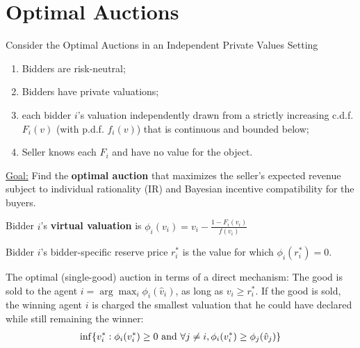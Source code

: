 \documentclass[11pt]{elegantbook}
\begin{document}
\section{Optimal Auctions}
Consider the Optimal Auctions in an Independent Private Values Setting
\begin{enumerate}
    \item Bidders are risk-neutral;
    \item Bidders have private valuations;
    \item each bidder $i$'s valuation independently drawn from a strictly increasing c.d.f. $F_i(v)$ (with p.d.f. $f_i(v)$) that is continuous and bounded below;
    \item Seller knows each $F_i$ and have no value for the object.
\end{enumerate}

\underline{Goal:} Find the \textbf{optimal auction} that maximizes the seller's expected revenue subject to individual rationality (IR) and Bayesian incentive compatibility for the buyers.


\begin{definition}
    \normalfont
    Bidder $i$'s \textbf{virtual valuation} is $\phi_i(v_i)=v_i-\frac{1-F_i(v_i)}{f(v_i)}$
\end{definition}

\begin{definition}
    \normalfont
    Bidder $i$'s bidder-specific reserve price $r_i^*$ is the value for which $\phi_i(r_i^*)=0$.
\end{definition}

\begin{theorem}[Myerson (1981)]
    The optimal (single-good) auction in terms of a direct mechanism: The good is sold to the agent $i=\arg\max_i\phi_i(\hat{v}_i)$, as long as $v_i\geq r_i^*$. If the good is sold, the winning agent $i$ is charged the smallest valuation that he could have declared while still remaining the winner:
    \begin{equation}
        \begin{aligned}
            \inf\{v_i^*:\phi_i(v_i^*)\geq 0 \textnormal{ and }\forall j\neq i, \phi_i(v_i^*)\geq \phi_j(\hat{v}_j)\}
        \end{aligned}
        \nonumber
    \end{equation}
\end{theorem}
\end{document}
